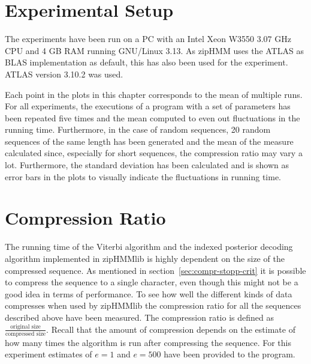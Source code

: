 \section{Experimental Setup}

The experiments have been run on a PC with an Intel Xeon W3550 $3.07$ GHz CPU
and 4 GB RAM running GNU/Linux 3.13. As zipHMM uses the ATLAS as BLAS
implementation as default, this has also been used for the experiment. ATLAS
version 3.10.2 was used. 

Each point in the plots in this chapter corresponds to the mean of multiple
runs. For all experiments, the executions of a program with a set of parameters
has been repeated five times and the mean computed to even out fluctuations in
the running time. Furthermore, in the case of random sequences, 20 random
sequences of the same length has been generated and the mean of the measure
calculated since, especially for short sequences, the compression ratio may vary
a lot. Furthermore, the standard deviation has been calculated and is shown as
error bars in the plots to visually indicate the fluctuations in running time.



\section{Compression Ratio}
\label{sec:compression-ratio}

The running time of the Viterbi algorithm and the indexed posterior decoding
algorithm implemented in zipHMMlib is highly dependent on the size of the
compressed sequence. As mentioned in section~\ref{sec:compr-stopp-crit} it is
possible to compress the sequence to a single character, even though this might
not be a good idea in terms of performance. To see how well the different kinds
of data compresses when used by zipHMMlib the compression ratio for all the
sequences described above have been measured. The compression ratio is defined
as $\frac{\text{original size}}{\text{compressed size}}$. Recall that the
amount of compression depends on the estimate of how many times the algorithm
is run after compressing the sequence. For this experiment estimates of
$e = 1$ and $e = 500$ have been provided to the program.


